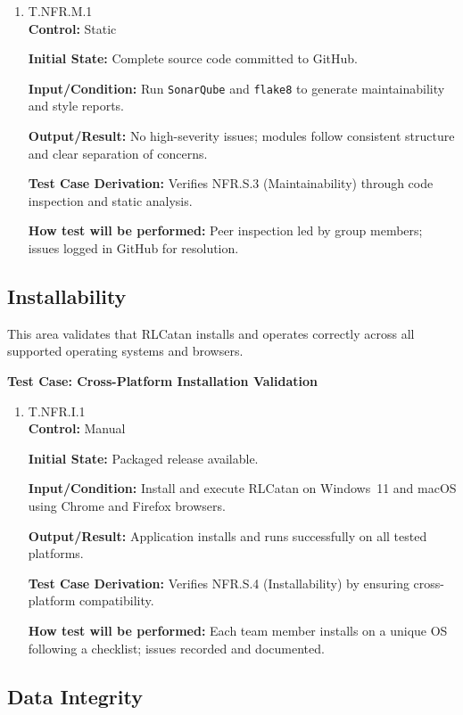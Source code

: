 \documentclass[12pt, titlepage]{article}
\begin{document}
\begin{enumerate}
\item T.NFR.M.1 \\
\textbf{Control:} Static

\textbf{Initial State:} Complete source code committed to GitHub.

\textbf{Input/Condition:} Run \texttt{SonarQube} and \texttt{flake8} to generate maintainability and style reports.

\textbf{Output/Result:} No high-severity issues; modules follow consistent structure and clear separation of concerns.

\textbf{Test Case Derivation:} Verifies NFR.S.3 (Maintainability) through code inspection and static analysis.

\textbf{How test will be performed:} Peer inspection led by group members; issues logged in GitHub for resolution.
\end{enumerate}

\subsection{Installability}

This area validates that RLCatan installs and operates correctly across all supported operating systems and browsers.

\textbf{Test Case: Cross-Platform Installation Validation}

\begin{enumerate}
\item T.NFR.I.1 \\
\textbf{Control:} Manual

\textbf{Initial State:} Packaged release available.

\textbf{Input/Condition:} Install and execute RLCatan on Windows~11 and macOS using Chrome and Firefox browsers.

\textbf{Output/Result:} Application installs and runs successfully on all tested platforms.

\textbf{Test Case Derivation:} Verifies NFR.S.4 (Installability) by ensuring cross-platform compatibility.

\textbf{How test will be performed:} Each team member installs on a unique OS following a checklist; issues recorded and documented.
\end{enumerate}

\subsection{Data Integrity}
\end{document}
